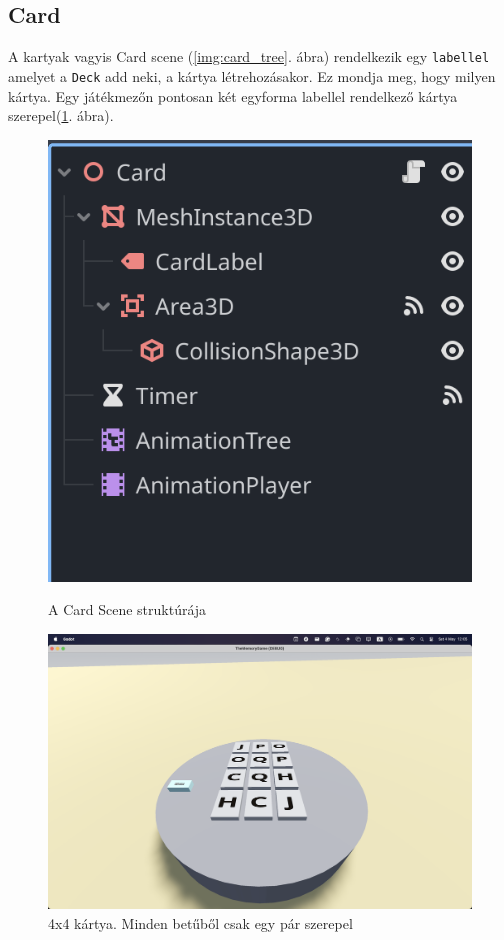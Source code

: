 \subsection{Card}
A kartyak vagyis Card scene (\ref{img:card_tree}. ábra) rendelkezik egy \lstinline|labellel| amelyet a \lstinline|Deck| add neki, a kártya létrehozásakor. Ez mondja meg, hogy milyen kártya. 
Egy játékmezőn pontosan két egyforma labellel rendelkező kártya szerepel(\ref{img:cards_has_pairs}. ábra).

\begin{figure}[H]
    \centering
    \begin{minipage}[b]{0.45\textwidth}
        \includegraphics[width=\textwidth]{img/cards_scene_tree.png}
        \caption{A Card Scene struktúrája}
        \label{img:card_tree}
    \end{minipage}
    \hfill
    \begin{minipage}[b]{0.45\textwidth}
        \includegraphics[width=\textwidth]{img/4x4_all_card_fliped.png}
        \caption{4x4 kártya. Minden betűből csak egy pár szerepel}
        \label{img:cards_has_pairs}  
    \end{minipage}
\end{figure}

